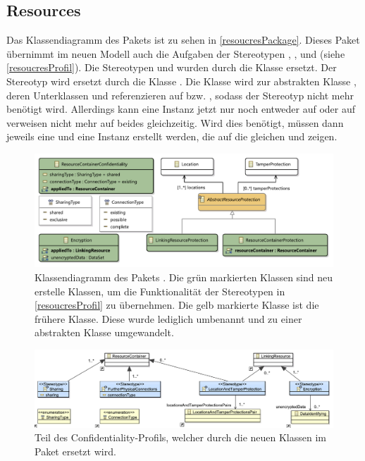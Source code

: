 \documentclass[twoside, ngerman]{sdqseminar}
\begin{document}
\subsection{Resources}
Das Klassendiagramm des Pakets  ist zu sehen in \autoref{resoucresPackage}. Dieses Paket übernimmt im neuen Modell auch die Aufgaben der Stereotypen , ,  und  (siehe \autoref{resoucresProfil}). Die Stereotypen  und  wurden durch die Klasse  ersetzt. Der Stereotyp  wird ersetzt durch die Klasse . Die Klasse  wird zur abstrakten Klasse , deren Unterklassen  und  referenzieren auf  bzw. , sodass der Stereotyp  nicht mehr benötigt wird. Allerdings kann eine  Instanz jetzt nur noch entweder auf  oder auf  verweisen nicht mehr auf beides gleichzeitig. Wird dies benötigt, müssen dann jeweils eine  und eine  Instanz erstellt werden, die auf die gleichen  und  zeigen.
\begin{figure}
	\centering
	\includegraphics[width=\textwidth]{images/new/resources.pdf}
	\caption{Klassendiagramm des Pakets . Die grün markierten Klassen sind neu erstelle Klassen, um die Funktionalität der Stereotypen in \autoref{resoucresProfil} zu übernehmen. Die gelb markierte Klasse  ist die frühere  Klasse. Diese wurde lediglich umbenannt und zu einer abstrakten Klasse umgewandelt. }\label{resoucresPackage}
\end{figure}
\begin{figure}
	\centering
	\includegraphics[width=\textwidth]{images/old/resourceProfile.pdf}
	\caption{Teil des Confidentiality-Profils, welcher durch die neuen Klassen im Paket  ersetzt wird. }\label{resoucresProfil}
\end{figure}
\end{document}
